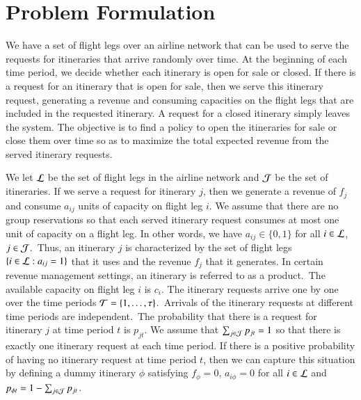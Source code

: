 \section{Problem Formulation}
\label{sec:form}

We have a set of flight legs over an airline network that can be used to serve the requests for itineraries that arrive randomly over time. At the beginning of each time period, we decide whether each itinerary is open for sale or closed. If there is a request for an itinerary that is open for sale, then we serve this itinerary request, generating a revenue and consuming capacities on the flight legs that are included in the requested itinerary. A request for a closed itinerary simply leaves the system. The objective is to find a policy to open the itineraries for sale or close them over time so as to maximize the total expected revenue from the served itinerary requests.


We let ${\cal L}$ be the set of flight legs in the airline network and ${\cal J}$ be the set of itineraries. If we serve a request for itinerary $j$, then we generate a revenue of $f_j$ and consume $a_{ij}$ units of capacity on flight leg $i$. We assume that there are no group reservations so that each served itinerary request consumes at most one unit of capacity on a flight leg. In other words, we have $a_{ij} \in \{0,1\}$ for all $i \in {\cal L}$, $j \in {\cal J}$.~Thus, an itinerary $j$ is characterized by the set of flight legs $\{ i \in {\cal L}: a_{ij} = 1\}$ that it uses and the revenue $f_j$ that it generates. In certain revenue management settings, an itinerary is referred to as a product.~The available capacity on flight leg $i$ is $c_i$. The itinerary requests arrive one by one over the time periods ${\cal T} = \{1,\ldots,\tau\}$.~Arrivals of the itinerary requests at different time periods are independent.~The probability that there is a request for itinerary $j$ at time period $t$ is $p_{jt}$. We assume that $\sum_{j \in {\cal J}} p_{jt} = 1$ so that there is exactly one itinerary request at each time period. If there is a positive probability of having no itinerary request at time period $t$, then we can capture this situation by defining a dummy itinerary $\phi$ satisfying $f_\phi = 0$, $a_{i \phi} = 0$ for all $i \in {\cal L}$  and $p_{\phi t} = 1-\sum_{j \in {\cal J}} p_{jt}$. 




